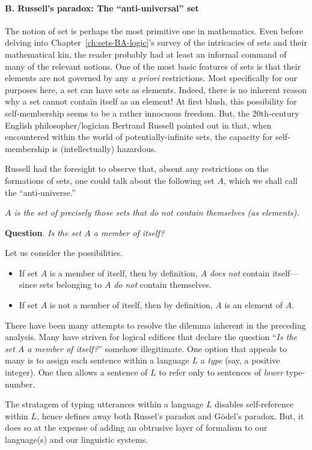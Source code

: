 \paragraph{B.  Russell's paradox: The ``anti-universal'' set}

The notion of set is perhaps the most primitive one in mathematics.
Even before delving into Chapter~\ref{ch:sets-BA-logic}'s survey of
the intricacies of sets and their mathematical kin, the reader
probably had at least an informal command of many of the relevant
notions.  One of the most basic features of sets is that their
elements are not governed by any {\it a priori} restrictions.  Most
specifically for our purposes here, a set can have sets as elements.
Indeed, there is no inherent reason why a set cannot contain itself as
an element!  At first blush, this possibility for self-membership
seems to be a rather innocuous freedom.  But, the 20th-century English
philosopher/logician Bertrand Russell
pointed out in \cite{Russell02,Russell03} that, when encountered
within the world of potentially-infinite sets, the capacity for
self-membership is (intellectually) hazardous.

Russell had the foresight to observe that, absent any restrictions on
the formations of sets, one could talk about the following set $A$,
which we shall call the ``anti-universe.''

\smallskip

{\em $A$ is the set of precisely those sets that {\em do not} contain themselves
  (as elements).}

\medskip

\noindent
{\bf Question}.  {\it Is the set $A$ a member of itself?}

\noindent
Let us consider the possibilities.
\begin{itemize}
\item
If set $A$ is a member of itself, then by definition, $A$ {\em does
  not} contain itself---since sets belonging to $A$ {\em do not}
contain themselves.

\item
If set $A$ is not a member of itself, then by definition, $A$ is an
element of $A$.
\end{itemize}

There have been many attempts to resolve the dilemma inherent in the
preceding analysis.  Many have striven for logical edifices that
declare the question ``{\it Is the set $A$ a member of itself?}'' somehow 
illegitimate.  One option that appeals to many is to assign each sentence 
within a language $L$ a {\it type} (say, a positive integer).  One then allows 
a sentence of $L$ to refer only to sentences of {\em lower} type-number.

The stratagem of typing utterances within a language $L$ disables
self-reference within $L$, hence defines away both Russel's paradox
and G\"{o}del's paradox. But, it does so at the expense of adding an
obtrusive layer of formalism to our language(s) and our linguistic
systems.
